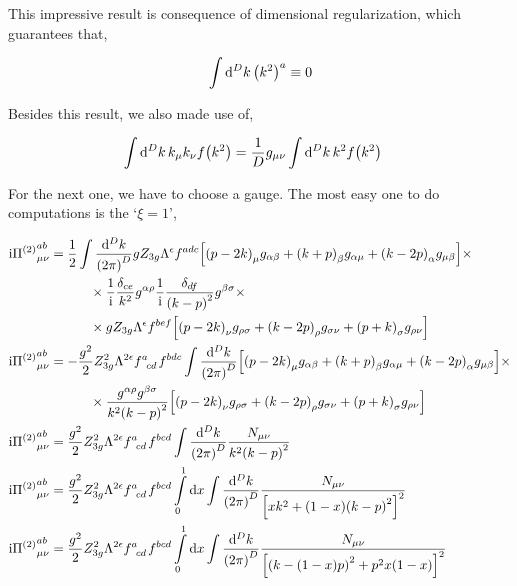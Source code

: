 This impressive result is consequence of dimensional regularization, which guarantees that,

\begin{align}
    \int\dd[D]{k}\qty(k^2)^a\equiv0\nonumber
\end{align}

Besides this result, we also made use of,

\begin{align}
    \int\dd[D]{k}k_\mu k_\nu f\qty(k^2)&=\frac{1}{D}g_{\mu\nu}\int\dd[D]{k}k^2f\qty(k^2)\nonumber
\end{align}

For the next one, we have to choose a gauge. The most easy one to do computations is the `$\xi = 1$',

\begin{align}
    \im {\Pi^{\qty(2)}}^{ab}_{\mu\nu}&=\frac12\int\frac{\dd[D]{k}}{\qty(2\pi)^D}gZ_{3g}
    \Lambda^\epsilon\tensor{f}{^a^d^c}
    \qty[\qty(p-2k)_\mu g_{\alpha\beta}+\qty(k+p)_\beta g_{\alpha\mu}+\qty(k-2p)_\alpha g_{\mu\beta}]\times\nonumber\\
    &\quad\quad\quad\times\frac{1}{\im}\frac{\delta_{ce}}{k^2}g^{\alpha\rho}\frac{1}{\im}\frac{\delta_{df}}{\qty(k-p)^2}g^{\beta\sigma}\times\nonumber\\
    &\quad\quad\quad\times gZ_{3g}\Lambda^\epsilon\tensor{f}{^b^e^f}\qty[\qty(p-2k)_\nu g_{\rho\sigma}+\qty(k-2p)_\rho g_{\sigma\nu}+\qty(p+k)_\sigma g_{\rho\nu}]\nonumber\\
    \im {\Pi^{\qty(2)}}^{ab}_{\mu\nu}&=-\frac{g^2}{2}Z_{3g}^2\Lambda^{2\epsilon}\tensor{f}{^a_c_d}\tensor{f}{^b^d^c}\int\frac{\dd[D]{k}}{\qty(2\pi)^D}\qty[\qty(p-2k)_\mu g_{\alpha\beta}+\qty(k+p)_\beta g_{\alpha\mu}+\qty(k-2p)_\alpha g_{\mu\beta}]\times\nonumber\\
    &\quad\quad\quad\times\frac{g^{\alpha\rho}g^{\beta\sigma}}{k^2\qty(k-p)^2}\qty[\qty(p-2k)_\nu g_{\rho\sigma}+\qty(k-2p)_\rho g_{\sigma\nu}+\qty(p+k)_\sigma g_{\rho\nu}]\nonumber\\
    \im {\Pi^{\qty(2)}}^{ab}_{\mu\nu}&=\frac{g^2}{2}Z_{3g}^2\Lambda^{2\epsilon}\tensor{f}{^a_c_d}\tensor{f}{^b^c^d}\int\frac{\dd[D]{k}}{\qty(2\pi)^D}\frac{N_{\mu\nu}}{k^2\qty(k-p)^2}\nonumber\\
    \im {\Pi^{\qty(2)}}^{ab}_{\mu\nu}&=\frac{g^2}{2}Z_{3g}^2\Lambda^{2\epsilon}\tensor{f}{^a_c_d}\tensor{f}{^b^c^d}\int\limits_0^1\dd{x}\int\frac{\dd[D]{k}}{\qty(2\pi)^D}\frac{N_{\mu\nu}}{\qty[xk^2 + \qty(1-x)\qty(k-p)^2]^2}\nonumber\\
    \im {\Pi^{\qty(2)}}^{ab}_{\mu\nu}&=\frac{g^2}{2}Z_{3g}^2\Lambda^{2\epsilon}\tensor{f}{^a_c_d}\tensor{f}{^b^c^d}\int\limits_0^1\dd{x}\int\frac{\dd[D]{k}}{\qty(2\pi)^D}\frac{N_{\mu\nu}}{\qty[\qty(k-\qty(1-x)p)^2+p^2x\qty(1-x)]^2}\nonumber
\end{align}

